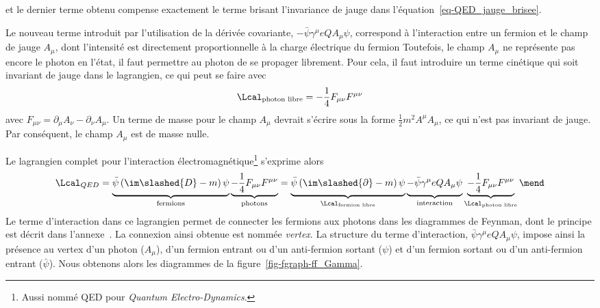 et le dernier terme obtenu compense exactement le terme brisant l'invariance de jauge dans l'équation~\eqref{eq-QED_jauge_brisee}.
\par Le nouveau terme introduit par l'utilisation de la dérivée covariante, $- \bar{\psi}\gamma^\mu eQA_\mu \psi$, correspond à l'interaction entre un fermion et le champ de jauge $A_\mu$, dont l'intensité est directement proportionnelle à la charge électrique du fermion
Toutefois, le champ $A_\mu$ ne représente pas encore le photon en l'état, il faut permettre au photon de se propager librement. Pour cela, il faut introduire un terme cinétique qui soit invariant de jauge dans le lagrangien, ce qui peut se faire avec
\begin{equation}
\Lcal_{\text{photon libre}} = - \frac{1}{4} F_{\mu\nu}F^{\mu\nu}
\end{equation}
avec $F_{\mu\nu} = \partial_\mu A_\nu - \partial_\nu A_\mu$.
Un terme de masse pour le champ $A_\mu$ devrait s'écrire sous la forme $\frac{1}{2}m^2A^\mu A_\mu$, ce qui n'est pas invariant de jauge. Par conséquent, le champ $A_\mu$ est de masse nulle.
\par Le lagrangien complet pour l'interaction électromagnétique\footnote{Aussi nommé QED pour \emph{Quantum Electro-Dynamics}.} s'exprime alors
\begin{equation}
\Lcal_{QED}
=
\underbrace{\bar{\psi} \left( \im\slashed{D} - m \right) \psi \vphantom{\frac{1}{4}}}_{\text{fermions}}
\underbrace{- \frac{1}{4} F_{\mu\nu}F^{\mu\nu} \vphantom{\frac{1}{4}}}_{\text{photons}}
=
\underbrace{\bar{\psi} \left( \im\slashed{\partial} - m \right) \psi \vphantom{\frac{1}{4}}}_{\Lcal_{\text{fermion libre}}}
\underbrace{- \bar{\psi}\gamma^\mu eQA_\mu \psi \vphantom{\frac{1}{4}}}_{\text{interaction}}
\underbrace{- \frac{1}{4} F_{\mu\nu}F^{\mu\nu} \vphantom{\frac{1}{4}}}_{\Lcal_{\text{photon libre}}}
\mend
\end{equation}
Le terme d'interaction dans ce lagrangien permet de \og connecter \fg{} les fermions aux photons dans les diagrammes de Feynman, dont le principe est décrit dans l'annexe~.
La \og connexion \fg{} ainsi obtenue est nommée \emph{vertex}.
La structure du terme d'interaction, $\bar{\psi}\gamma^\mu eQA_\mu \psi$, impose ainsi la présence au vertex d'un photon ($A_\mu$), d'un fermion entrant ou d'un anti-fermion sortant ($\psi$) et d'un fermion sortant ou d'un anti-fermion entrant ($\bar{\psi}$). Nous obtenons alors les diagrammes de la figure~\ref{fig-fgraph-ff_Gamma}.
